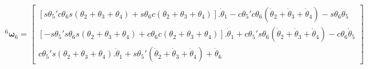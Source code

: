 \begin{equation}
\begin{gathered}
    ^6\boldsymbol{\omega}_6 = \begin{bmatrix}
        [s\theta_5'c\theta_6s(\theta_2+\theta_3+\theta_4) + s\theta_6c(\theta_2+\theta_3+\theta_4)].\dot{\theta}_1 - c\theta_5'c\theta_6(\dot{\theta}_2 + \dot{\theta}_3 + \dot{\theta}_4) - s\theta_6\dot{\theta}_5 \\
        [-s\theta_5's\theta_6s(\theta_2+\theta_3+\theta_4) + c\theta_6c(\theta_2+\theta_3+\theta_4)].\dot{\theta}_1 + c\theta_5's\theta_6(\dot{\theta}_2 + \dot{\theta}_3 + \dot{\theta}_4) - c\theta_6\dot{\theta}_5 \\ 
        c\theta_5's(\theta_2+\theta_3+\theta_4).\dot{\theta}_1 + s\theta_5'(\dot{\theta}_2 + \dot{\theta}_3 + \dot{\theta}_4) + \dot{\theta}_6
    \end{bmatrix}
\end{gathered}
\end{equation}

